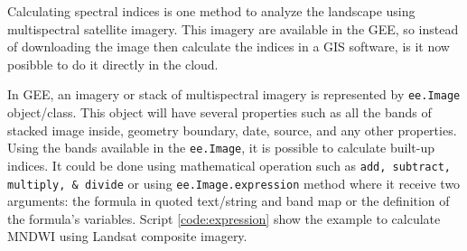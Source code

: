 Calculating spectral indices is one method to analyze the landscape using multispectral satellite imagery. This imagery are available in the GEE, so instead of downloading the image then calculate the indices in a GIS software, is it now posibble to do it directly in the cloud. 

In GEE, an imagery or stack of multispectral imagery is represented by \verb|ee.Image| object/class. This object will have several properties such as all the bands of stacked image inside, geometry boundary, date, source, and any other properties. Using the bands available in the \verb|ee.Image|, it is possible to calculate built-up indices. It could be done using mathematical operation such as \verb|add, subtract, multiply, & divide| or using \verb|ee.Image.expression| method where it receive two arguments: the formula in quoted text/string and band map or the definition of the formula's variables. Script \ref{code:expression} show the example to calculate MNDWI using Landsat composite imagery.

